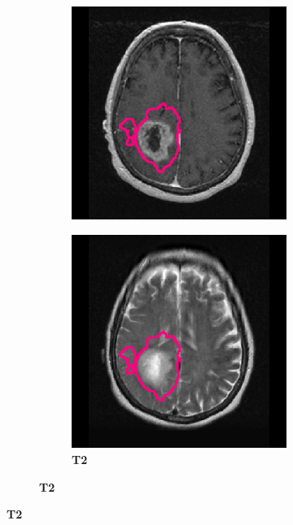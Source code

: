 \begin{subappendices}
\begin{figure}[htbp]
\begin{subfigure}[b]{0.8\textwidth}
\begin{subfigure}[b]{0.215\textwidth}
        \includegraphics[width=\textwidth, clip, trim=2.5cm 0.5cm 2.5cm 0.5cm]{Figures/Random_segs/T1GD_TCGA-02-0037.png}
        \end{subfigure}
        \hfill
        \begin{subfigure}[b]{0.215\textwidth}
        \caption*{\normalfont \textbf{\acrshort{T2}}\nopunct}
        \includegraphics[width=\textwidth, clip, trim=2.5cm 0.5cm 2.5cm 0.5cm]{Figures/Random_segs/T2_TCGA-02-0037.png}

\end{subfigure}
\end{subfigure}
\end{figure}
\end{subappendices}
